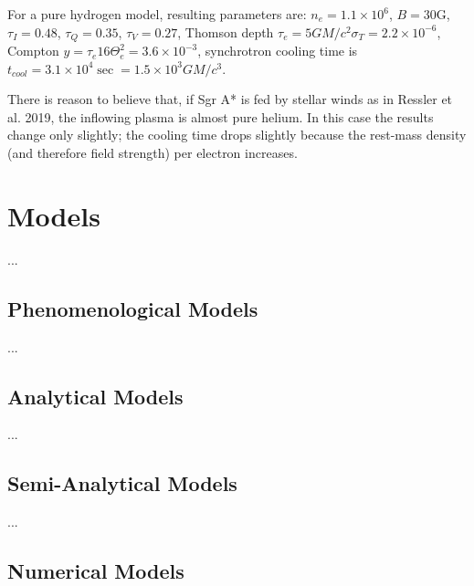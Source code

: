 \documentclass[twocolumn,tighten]{aastex63}
\newcommand\<{{\langle}}
\renewcommand\>{{\rangle}} %
\begin{document}
For a pure hydrogen model, resulting parameters are: $n_e = 1.1 \times 10^6$, $B = 30$G, $\tau_I = 0.48$, $\tau_Q = 0.35 $, $\tau_V = 0.27$, Thomson depth $\tau_e = 5 G M/c^2 \sigma_T = 2.2 \times 10^{-6}$, Compton $y = \tau_e 16 \Theta_e^2 = 3.6 \times 10^{-3}$, synchrotron cooling time is $t_{cool} = 3.1 \times 10^4\sec = 1.5 \times 10^3 G M/c^3$.

There is reason to believe that, if Sgr A* is fed by stellar winds as in Ressler et al. 2019, the inflowing plasma is almost pure helium.  In this case the results change only slightly; the cooling time drops slightly because the rest-mass density (and therefore field strength) per electron increases.

\section{Models}

...

\subsection{Phenomenological Models}

...

\subsection{Analytical Models}

...

\subsection{Semi-Analytical Models}

...

\subsection{Numerical Models}

\end{document}
